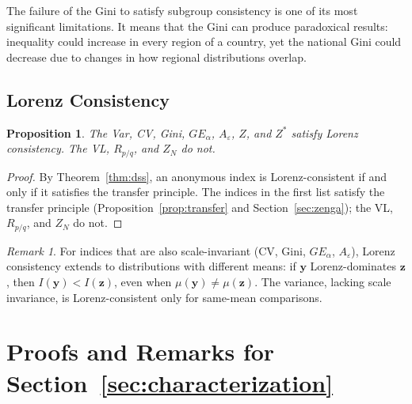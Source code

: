 \documentclass[12pt]{article}
\theoremstyle{plain}
\newtheorem{proposition}[theorem]{Proposition}
\theoremstyle{definition}
\theoremstyle{remark}
\newtheorem{remark}[theorem]{Remark}
\newcommand{\bfy}{\mathbf{y}}
\newcommand{\bfz}{\mathbf{z}}
\begin{document}
The failure of the Gini to satisfy subgroup consistency is one of its most significant limitations.
It means that the Gini can produce paradoxical results: inequality could increase in every region of a country, yet the national Gini could decrease due to changes in how regional distributions overlap.

\subsection{Lorenz Consistency}

\begin{proposition}\label{prop:lorenz}
The Var, CV, Gini, $GE_\alpha$, $A_\varepsilon$, $Z$, and $Z^*$ satisfy Lorenz consistency.
The VL, $R_{p/q}$, and $Z_N$ do not.
\end{proposition}

\begin{proof}
By Theorem~\ref{thm:dss}, an anonymous index is Lorenz-consistent if and only if it satisfies the transfer principle.
The indices in the first list satisfy the transfer principle (Proposition~\ref{prop:transfer} and Section~\ref{sec:zenga}); the VL, $R_{p/q}$, and $Z_N$ do not.
\end{proof}

\begin{remark}
For indices that are also scale-invariant (CV, Gini, $GE_\alpha$, $A_\varepsilon$), Lorenz consistency extends to distributions with different means: if $\bfy$ Lorenz-dominates $\bfz$, then $I(\bfy) < I(\bfz)$, even when $\mu(\bfy) \neq \mu(\bfz)$.
The variance, lacking scale invariance, is Lorenz-consistent only for same-mean comparisons.
\end{remark}

\section{Proofs and Remarks for Section~\ref{sec:characterization}}\label{app:proofs}
\setcounter{theorem}{0}
\renewcommand{\thetheorem}{B.\arabic{theorem}}
\end{document}
